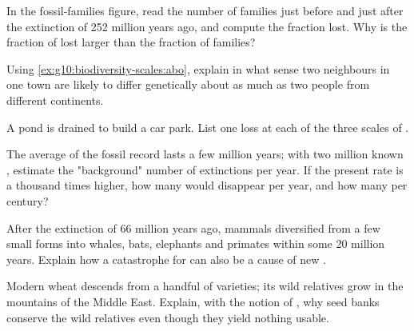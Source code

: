 \begin{exercise}[$\star\star$]\label{exo:g10:biodiversity-scales:9}
In the fossil-families figure, read the number of families just before
and just after the extinction of 252 million years ago, and compute
the fraction lost. Why is the fraction of \emph{} lost larger
than the fraction of families?
\end{exercise}

\begin{exercise}[$\star\star$]\label{exo:g10:biodiversity-scales:10}
Using \cref{ex:g10:biodiversity-scales:abo}, explain in what sense two
neighbours in one town are likely to differ genetically about as much
as two people from different continents.
\end{exercise}

\begin{exercise}[$\star\star$]\label{exo:g10:biodiversity-scales:11}
A pond is drained to build a car park. List one loss at each of the
three scales of .
\end{exercise}

\begin{exercise}[$\star\star\star$]\label{exo:g10:biodiversity-scales:12}
The average  of the fossil record lasts a few million years;
with two million known , estimate the "background" number of
extinctions per year. If the present rate is a thousand times higher,
how many  would disappear per year, and how many per century?
\end{exercise}

\begin{exercise}[$\star\star\star$]\label{exo:g10:biodiversity-scales:13}
After the extinction of 66 million years ago, mammals diversified from
a few small forms into whales, bats, elephants and primates within
some 20 million years. Explain how a catastrophe for  can
also be a cause of new .
\end{exercise}

\begin{exercise}[$\star\star\star$]\label{exo:g10:biodiversity-scales:14}
Modern wheat descends from a handful of varieties; its wild relatives
grow in the mountains of the Middle East. Explain, with the notion of
, why seed banks conserve the wild relatives even
though they yield nothing usable.
\end{exercise}

